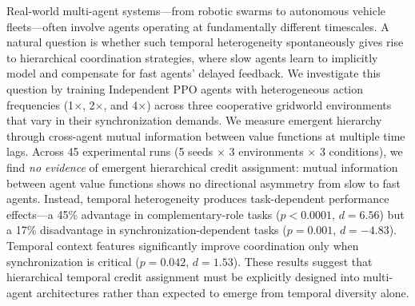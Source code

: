 Real-world multi-agent systems---from robotic swarms to autonomous vehicle fleets---often involve agents operating at fundamentally different timescales. A natural question is whether such temporal heterogeneity spontaneously gives rise to hierarchical coordination strategies, where slow agents learn to implicitly model and compensate for fast agents' delayed feedback. We investigate this question by training Independent PPO agents with heterogeneous action frequencies (1$\times$, 2$\times$, and 4$\times$) across three cooperative gridworld environments that vary in their synchronization demands. We measure emergent hierarchy through cross-agent mutual information between value functions at multiple time lags. Across 45 experimental runs (5 seeds $\times$ 3 environments $\times$ 3 conditions), we find \emph{no evidence} of emergent hierarchical credit assignment: mutual information between agent value functions shows no directional asymmetry from slow to fast agents. Instead, temporal heterogeneity produces task-dependent performance effects---a 45\% advantage in complementary-role tasks ($p < 0.0001$, $d = 6.56$) but a 17\% disadvantage in synchronization-dependent tasks ($p = 0.001$, $d = -4.83$). Temporal context features significantly improve coordination only when synchronization is critical ($p = 0.042$, $d = 1.53$). These results suggest that hierarchical temporal credit assignment must be explicitly designed into multi-agent architectures rather than expected to emerge from temporal diversity alone.
